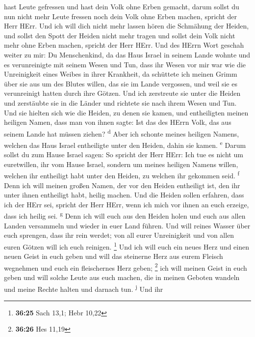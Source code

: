 hast Leute gefressen und hast dein Volk ohne Erben gemacht,
 darum sollst du nun nicht mehr Leute fressen noch dein
Volk ohne Erben machen, spricht der Herr HErr.  Und ich
will dich nicht mehr lassen hören die Schmähung der Heiden, und sollst
den Spott der Heiden nicht mehr tragen und sollst dein Volk nicht mehr
ohne Erben machen, spricht der Herr HErr.  Und des HErrn
Wort geschah weiter zu mir:  Du Menschenkind, da das Haus
Israel in seinem Lande wohnte und es verunreinigte mit seinem Wesen und
Tun, dass ihr Wesen vor mir war wie die Unreinigkeit eines Weibes in
ihrer Krankheit,  da schüttete ich meinen Grimm über sie
aus um des Blutes willen, das sie im Lande vergossen, und weil sie es
verunreinigt hatten durch ihre Götzen.  Und ich
zerstreute sie unter die Heiden und zerstäubte sie in die Länder und
richtete sie nach ihrem Wesen und Tun.  Und sie hielten
sich wie die Heiden, zu denen sie kamen, und entheiligten meinen
heiligen Namen, dass man von ihnen sagte: Ist das des HErrn Volk, das
aus seinem Lande hat müssen ziehen? \textsuperscript{d} 
Aber ich schonte meines heiligen Namens, welchen das Haus Israel
entheiligte unter den Heiden, dahin sie kamen. \textsuperscript{e}
 Darum sollst du zum Hause Israel sagen: So spricht der
Herr HErr: Ich tue es nicht um euretwillen, ihr vom Hause Israel,
sondern um meines heiligen Namens willen, welchen ihr entheiligt habt
unter den Heiden, zu welchen ihr gekommen seid. \textsuperscript{f}
 Denn ich will meinen großen Namen, der vor den Heiden
entheiligt ist, den ihr unter ihnen entheiligt habt, heilig machen. Und
die Heiden sollen erfahren, dass ich der HErr sei, spricht der Herr
HErr, wenn ich mich vor ihnen an euch erzeige, dass ich heilig sei.
\textsuperscript{g}  Denn ich will euch aus den Heiden
holen und euch aus allen Landen versammeln und wieder in euer Land
führen.  Und will reines Wasser über euch sprengen, dass
ihr rein werdet; von all eurer Unreinigkeit und von allen euren Götzen
will ich euch reinigen. \footnote{\textbf{36:25} Sach 13,1; Hebr 10,22}
 Und ich will euch ein neues Herz und einen neuen Geist
in euch geben und will das steinerne Herz aus eurem Fleisch wegnehmen
und euch ein fleischernes Herz geben; \footnote{\textbf{36:26} Hes 11,19}
 ich will meinen Geist in euch geben und will solche
Leute aus euch machen, die in meinen Geboten wandeln und meine Rechte
halten und darnach tun. \textsuperscript{j}  Und ihr
